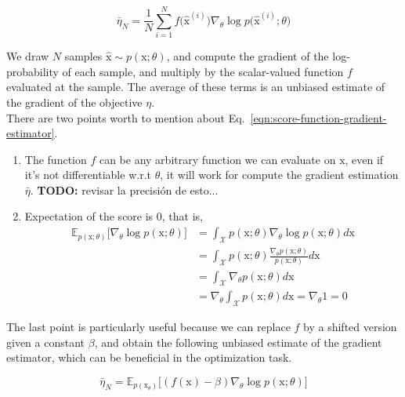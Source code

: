 \begin{equation}\label{eqn:score-function-gradient-estimator}
    \bar{\eta}_{N} = \frac{1}{N}\sum_{i=1}^{N}f\big(\hat{\mathrm{x}}^{(i)}\big) \nabla_{\theta}\log p\big(\hat{\mathrm{x}}^{(i)};\theta\big)
\end{equation}

We draw $N$ samples $\hat{\mathrm{x}}\sim p(\mathrm{x};\theta)$, and compute the gradient of the log-probability of each sample, and multiply by the scalar-valued function $f$ evaluated at the sample. The average of these terms is an unbiased estimate of the gradient of the objective $\eta$. \\

There are two points worth to mention about Eq.~\ref{eqn:score-function-gradient-estimator}.

\begin{enumerate}
    \item The function $f$ can be any arbitrary function we can evaluate on $\mathrm{x}$, even if it's not differentiable w.r.t $\theta$, it will work for compute the gradient estimation $\bar{\eta}$. \textbf{TODO:} revisar la precisión de esto...
    \item Expectation of the score is $0$, that is,
    \begin{equation}\label{eqn:score-function-expectation-zero}
    \begin{split}
        \mathbb{E}_{p(\mathrm{x};\theta)}\big[\nabla_{\theta}\log p(\mathrm{x};\theta)\big] 
        &= \int_{\mathcal{X}}p(\mathrm{x};\theta)\nabla_{\theta}\log p(\mathrm{x}; \theta) d\mathrm{x} \\
        &= \int_{\mathcal{X}} p(\mathrm{x};\theta)\frac{\nabla_{\theta} p(\mathrm{x}; \theta)}{p(\mathrm{x};\theta)}d\mathrm{x} \\
        &= \int_{\mathcal{X}}\nabla_{\theta}p(\mathrm{x};\theta)d\mathrm{x} \\
        &= \nabla_{\theta}\int_{\mathcal{X}} p(\mathrm{x}; \theta)d\mathrm{x} = \nabla_{\theta} 1 =0
    \end{split}
    \end{equation}
\end{enumerate}

The last point is particularly useful because we can replace $f$ by a shifted
version given a constant $\beta$, and obtain the following unbiased estimate of
the gradient estimator, which can be beneficial in the optimization task.

\begin{equation}\label{eqn:score-function-gradient-estimator-baseline}
\bar{\eta}_{N} = \mathbb{E}_{p(\mathrm{x}_{\theta})}\big[(f(\mathrm{x}) - \beta) \nabla_{\theta} \log p(\mathrm{x}; \theta)\big]
\end{equation}

